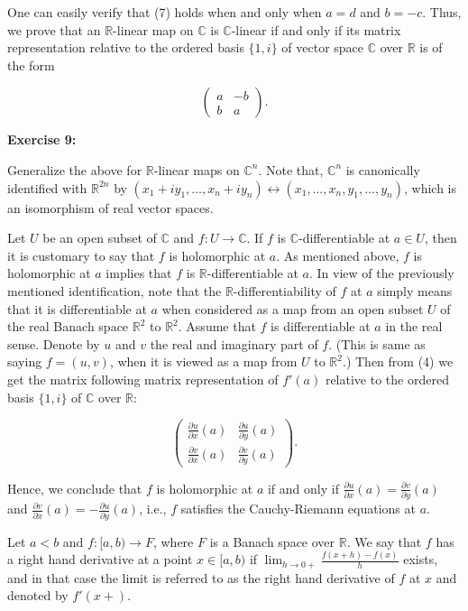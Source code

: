\documentclass{book}
\begin{document}
One can easily verify that (7) holds when and only when $a = d$ and $b = -c$. Thus, we prove that an $\mathbb{R}$-linear map on $\mathbb{C}$ is $\mathbb{C}$-linear if and only if its matrix representation relative to the ordered basis $\{1, i\}$ of vector space $\mathbb{C}$ over $\mathbb{R}$ is of the form

\[
\begin{pmatrix}
a & -b \\
b & a
\end{pmatrix}.
\]

\textbf{Exercise 9:}

Generalize the above for $\mathbb{R}$-linear maps on $\mathbb{C}^n$. Note that, $\mathbb{C}^n$ is canonically identified with $\mathbb{R}^{2n}$ by $(x_1 + iy_1, \ldots, x_n + iy_n) \leftrightarrow (x_1, \ldots, x_n, y_1, \ldots, y_n)$, which is an isomorphism of real vector spaces.

Let $U$ be an open subset of $\mathbb{C}$ and $f : U \to \mathbb{C}$. If $f$ is $\mathbb{C}$-differentiable at $a \in U$, then it is customary to say that $f$ is holomorphic at $a$. As mentioned above, $f$ is holomorphic at $a$ implies that $f$ is $\mathbb{R}$-differentiable at $a$. In view of the previously mentioned identification, note that the $\mathbb{R}$-differentiability of $f$ at $a$ simply means that it is differentiable at $a$ when considered as a map from an open subset $U$ of the real Banach space $\mathbb{R}^2$ to $\mathbb{R}^2$. Assume that $f$ is differentiable at $a$ in the real sense. Denote by $u$ and $v$ the real and imaginary part of $f$. (This is same as saying $f = (u, v)$, when it is viewed as a map from $U$ to $\mathbb{R}^2$.) Then from (4) we get the matrix following matrix representation of $f'(a)$ relative to the ordered basis $\{1, i\}$ of $\mathbb{C}$ over $\mathbb{R}$:

\[
\begin{pmatrix}
\frac{\partial u}{\partial x}(a) & \frac{\partial u}{\partial y}(a) \\
\frac{\partial v}{\partial x}(a) & \frac{\partial v}{\partial y}(a)
\end{pmatrix}.
\]

Hence, we conclude that $f$ is holomorphic at $a$ if and only if $\frac{\partial u}{\partial x}(a) = \frac{\partial v}{\partial y}(a)$ and $\frac{\partial v}{\partial x}(a) = -\frac{\partial u}{\partial y}(a)$, i.e., $f$ satisfies the Cauchy-Riemann equations at $a$.

Let $a < b$ and $f : [a, b) \to F$, where $F$ is a Banach space over $\mathbb{R}$. We say that $f$ has a right hand derivative at a point $x \in [a, b)$ if $\lim_{h \to 0+} \frac{f(x+h) - f(x)}{h}$ exists, and in that case the limit is referred to as the right hand derivative of $f$ at $x$ and denoted by $f'(x+)$.
\end{document}
